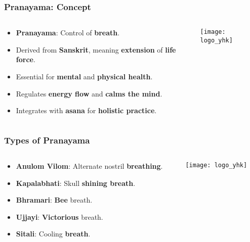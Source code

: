 \begin{frame}[fragile]\frametitle{Pranayama: Concept}
\begin{columns}
    \begin{column}[T]{0.5\linewidth}
      \begin{itemize}
        \item \textbf{Pranayama}: Control of \textbf{breath}.
        \item Derived from \textbf{Sanskrit}, meaning \textbf{extension} of \textbf{life force}.
        \item Essential for \textbf{mental} and \textbf{physical health}.
        \item Regulates \textbf{energy flow} and \textbf{calms the mind}.
        \item Integrates with \textbf{asana} for \textbf{holistic practice}.
      \end{itemize}
    \end{column}
    \begin{column}[T]{0.5\linewidth}
        \begin{center}
        \texttt{[image: logo\_yhk]}
        \end{center}	
    \end{column}
\end{columns}
\end{frame}

\begin{frame}[fragile]\frametitle{Types of Pranayama}
\begin{columns}
    \begin{column}[T]{0.5\linewidth}
      \begin{itemize}
        \item \textbf{Anulom Vilom}: Alternate nostril \textbf{breathing}.
        \item \textbf{Kapalabhati}: Skull \textbf{shining breath}.
        \item \textbf{Bhramari}: \textbf{Bee} breath.
        \item \textbf{Ujjayi}: \textbf{Victorious} breath.
        \item \textbf{Sitali}: Cooling \textbf{breath}.
      \end{itemize}
    \end{column}
    \begin{column}[T]{0.5\linewidth}
        \begin{center}
        \texttt{[image: logo\_yhk]}
        \end{center}	
    \end{column}
\end{columns}
\end{frame}

